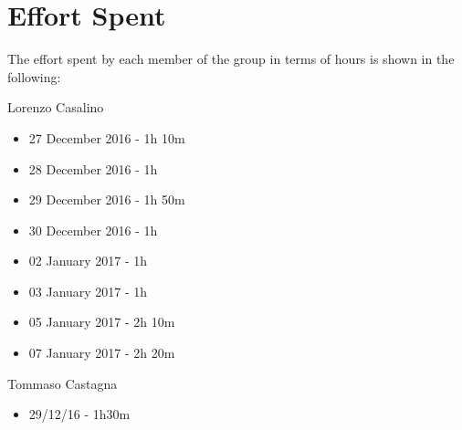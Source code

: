 \section{Effort Spent}

The effort spent by each member of the group in terms of hours is shown in the following:

Lorenzo Casalino

\begin{itemize}
	\item 27 December 2016 - 1h 10m
	\item 28 December 2016 - 1h
	\item 29 December 2016 - 1h 50m
	\item 30 December 2016 - 1h
	\item 02 January  2017 - 1h
	\item 03 January  2017 - 1h
	\item 05 January  2017 - 2h 10m
	\item 07 January  2017 - 2h 20m
\end{itemize}

Tommaso Castagna

\begin{itemize}
	\item 29/12/16 - 1h30m
\end{itemize}
